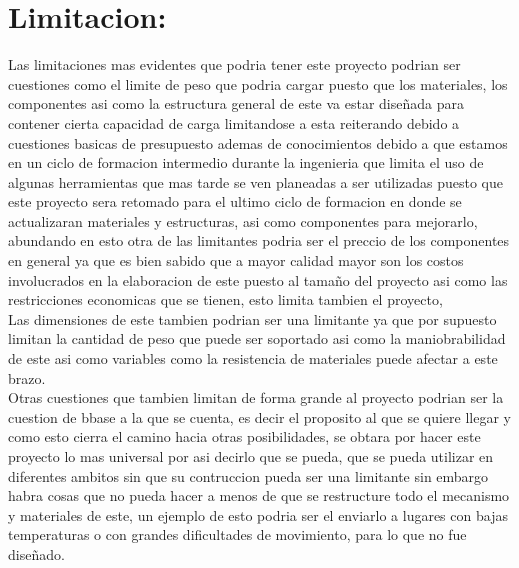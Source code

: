 \documentclass[14pt,a4paper]{article}
\begin{document}
\section{Limitacion:}
Las limitaciones mas evidentes que podria tener este proyecto podrian ser cuestiones como el limite de peso que podria cargar puesto que los materiales, los componentes asi como la estructura general de este va estar diseñada para contener cierta capacidad de carga limitandose a esta reiterando debido a cuestiones basicas de presupuesto ademas de conocimientos debido a que estamos en un ciclo de formacion intermedio durante la ingenieria que limita el uso de algunas herramientas que mas tarde se ven planeadas a ser utilizadas puesto que este proyecto sera retomado para el ultimo ciclo de formacion en donde se actualizaran materiales y estructuras, asi como componentes para mejorarlo, abundando en esto otra de las limitantes podria ser el preccio de los componentes en general ya que es bien sabido que a mayor calidad mayor son los costos involucrados en la elaboracion de este puesto al tamaño del proyecto asi como las restricciones economicas que se tienen, esto limita tambien el proyecto,\\
Las dimensiones de este tambien podrian ser una limitante ya que por supuesto limitan la cantidad de peso que puede ser soportado asi como la maniobrabilidad de este asi como variables como la resistencia de materiales puede afectar a este brazo.\\
Otras cuestiones que tambien limitan de forma grande al proyecto podrian ser la cuestion de bbase a la que se cuenta, es decir el proposito al que se quiere llegar y como esto cierra el camino hacia otras posibilidades, se obtara por hacer este proyecto lo mas universal por asi decirlo que se pueda, que se pueda utilizar en diferentes ambitos sin que su contruccion pueda ser una limitante sin embargo habra cosas que no pueda hacer a menos de que se restructure todo el mecanismo y materiales  de este, un ejemplo de esto podria ser el enviarlo a lugares con bajas temperaturas o con grandes dificultades de movimiento, para lo que no fue diseñado.\\
\end{document}
